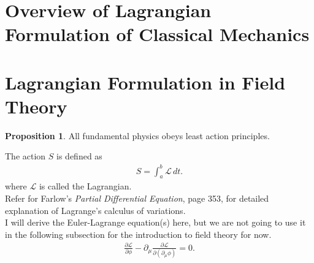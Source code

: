 \documentclass[a4paper,11pt]{article}
\numberwithin{equation}{section}
\theoremstyle{definition}
\newtheorem{prop}{Proposition}[section]
\begin{document}
\section{Overview of Lagrangian Formulation of Classical Mechanics}
\newpage
\section{Lagrangian Formulation in Field Theory}
\begin{prop}
	All fundamental physics obeys least action principles.
\end{prop}
The action $S$ is defined as
\begin{align*}
S = \int_{a}^{b}\mathcal{L}\,dt.
\end{align*}
where $\mathcal{L}$ is called the Lagrangian.\\

Refer for Farlow's \textit{Partial Differential Equation}, page 353, for detailed explanation of Lagrange's calculus of variations.\\

I will derive the Euler-Lagrange equation(s) here, but we are not going to use it in the following subsection for the introduction to field theory for now. \\
\begin{align*}
\frac{\partial \mathcal{L}}{\partial \phi} - \partial_\mu\frac{\partial \mathcal{L}}{\partial(\partial_\mu \phi)} = 0.
\end{align*}
\end{document}

